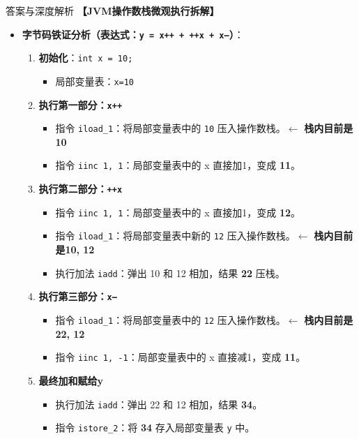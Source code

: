 \documentclass[12pt, a4paper]{ctexart}
\begin{document}
\begin{enumerate}[label=\textbf{\arabic*.}]
\begin{bluebox}{答案与深度解析}
		      \textbf{【JVM操作数栈微观执行拆解】}
		      \begin{itemize}[leftmargin=*, nosep]
			      \item \textbf{字节码铁证分析（表达式：\texttt{y = x++ + ++x + x--}）}：
			            \begin{enumerate}[label=\textbf{步骤\arabic*.}, leftmargin=*, nosep]
				            \item \textbf{初始化}：\texttt{int x = 10;}
				                  \begin{itemize}
					                  \item 局部变量表：\texttt{x=10}
				                  \end{itemize}
				            \item \textbf{执行第一部分：\texttt{x++}}
				                  \begin{itemize}
					                  \item 指令 \texttt{iload\_1}：将局部变量表中的 \texttt{10} 压入操作数栈。$\leftarrow$ \textbf{栈内目前是10}
					                  \item 指令 \texttt{iinc 1, 1}：局部变量表中的 x 直接加1，变成 \textbf{11}。
				                  \end{itemize}
				            \item \textbf{执行第二部分：\texttt{++x}}
				                  \begin{itemize}
					                  \item 指令 \texttt{iinc 1, 1}：局部变量表中的 x 直接加1，变成 \textbf{12}。
					                  \item 指令 \texttt{iload\_1}：将局部变量表中新的 \texttt{12} 压入操作数栈。$\leftarrow$ \textbf{栈内目前是10, 12}
					                  \item 执行加法 \texttt{iadd}：弹出 10 和 12 相加，结果 \textbf{22} 压栈。
				                  \end{itemize}
				            \item \textbf{执行第三部分：\texttt{x--}}
				                  \begin{itemize}
					                  \item 指令 \texttt{iload\_1}：将局部变量表中的 \texttt{12} 压入操作数栈。$\leftarrow$ \textbf{栈内目前是22, 12}
					                  \item 指令 \texttt{iinc 1, -1}：局部变量表中的 x 直接减1，变成 \textbf{11}。
				                  \end{itemize}
				            \item \textbf{最终加和赋给y}
				                  \begin{itemize}
					                  \item 执行加法 \texttt{iadd}：弹出 22 和 12 相加，结果 \textbf{34}。
					                  \item 指令 \texttt{istore\_2}：将 \textbf{34} 存入局部变量表 \texttt{y} 中。
				                  \end{itemize}
			            \end{enumerate}


\end{itemize}
\end{bluebox}
\end{enumerate}
\end{document}
